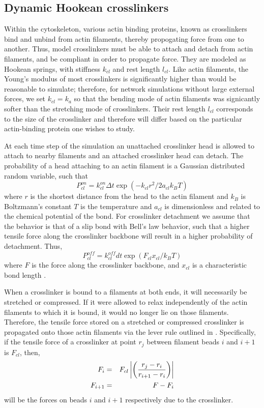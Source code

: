 \documentclass[12pt]{article}
\begin{document}
\subsection{Dynamic Hookean crosslinkers}
Within the cytoskeleton, various actin binding proteins, known as crosslinkers 
bind and unbind from actin filaments, thereby propogating force from one to
another. Thus, model crosslinkers must be able to attach and detach from actin filaments,
and be compliant in order to propagate force. They are modeled as Hookean springs, with stiffness
$k_{cl}$ and rest length $l_{cl}$. Like actin filaments, the Young's modulus of
most crosslinkers is significantly higher than would be reasonable to simulate; 
therefore, for network simulations without large external forces, we set $k_{cl}=k_a$ 
so that the bending mode of actin filaments was signicantly softer than the stretching mode of
crosslinkers. Their rest length $l_{cl}$ corresponds to the size of the crosslinker
and therefore will differ based on the particular actin-binding protein one wishes to study.
\par
At each time step of the simulation an unattached crosslinker head is allowed to attach to nearby
filaments and an attached crosslinker head can detach. 
The probability of a head attaching to an actin filament is a Gaussian distributed random variable, such that
\begin{equation}
  P_{cl}^{on} = k_{cl}^{on}\Delta t\exp(-k_{cl}r^2/2a_{cl}k_BT)
  \label{eqn:cl_on}
\end{equation} 
where $r$ is the shortest distance from the head to the actin filament and $k_B$ is Boltzmann's constant
$T$ is the temperature and $a_{cl}$ is dimensionless and related to the chemical potential of the bond. 
For crosslinker detachment we assume that the behavior is that of a slip bond with Bell's law behavior, 
such that a higher
tensile force along the crosslinker backbone will result in a higher probability of detachment\cite{bell1978}. Thus, 
\begin{equation}
  P_{cl}^{off} = k_{cl}^{off} dt\exp{\left(  F_{cl} x_{cl}/k_B T\right)}  
  \label{eqn:cl_off}
\end{equation}
where $F$ is the force along the crosslinker backbone, and $x_{cl}$ is a characteristic bond length \cite{stam2015}. 
\par
When a crosslinker is bound to a filaments at both ends, it will necessarily be stretched or compressed. 
If it were allowed to relax independently of the actin filaments to which it is bound, 
it would no longer lie on those filaments. Therefore, the tensile force stored on a stretched or compressed
crosslinker is propagated onto those actin filaments via the lever rule outlined in 
\cite{nedelec2002, gordon2012}. Specifically, if the tensile force of a crosslinker at point $r_j$ between 
filament beads $i$ and $i+1$ is $F_{cl}$, then, 
\begin{eqnarray} 
  F_i &=& F_{cl}\left|\left( {r_j - r_i \over r_{i+1} - r_i }\right)\right|\\\nonumber
  F_{i+1} &=& F-F_i 
  \label{eqn:lever}
\end{eqnarray}
will be the forces on beads $i$ and $i+1$ respectively due to the crosslinker.
\end{document}
